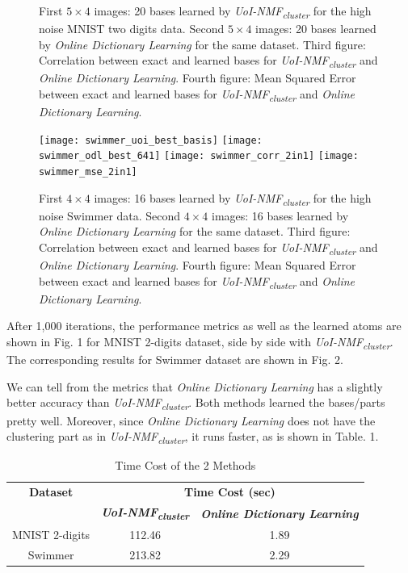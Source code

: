 \documentclass[conference]{IEEEtran}
\begin{document}
\begin{figure}[!htb]
\endminipage
\caption{First $5\times 4$ images: 20 bases learned by \textit{UoI-NMF\textsubscript{cluster}} for the high noise MNIST two digits data. Second $5\times 4$ images: 20 bases learned by \textit{Online Dictionary Learning} for the same dataset. Third figure: Correlation between exact and learned bases for \textit{UoI-NMF\textsubscript{cluster}} and \textit{Online Dictionary Learning}. Fourth figure: Mean Squared Error between exact and learned bases for \textit{UoI-NMF\textsubscript{cluster}} and \textit{Online Dictionary Learning}. }\label{fig:mnist_4}
\end{figure}

\begin{figure}[!htb]
\centering
{}
  \texttt{[image: swimmer\_uoi\_best\_basis]}
\endminipage\hfill
{}
  \texttt{[image: swimmer\_odl\_best\_641]}
\endminipage\hfill
{}%
  \texttt{[image: swimmer\_corr\_2in1]}
\endminipage
{}%
  \texttt{[image: swimmer\_mse\_2in1]}
\endminipage
\caption{First $4\times 4$ images: 16 bases learned by \textit{UoI-NMF\textsubscript{cluster}} for the
high noise Swimmer data. Second $4\times 4$ images: 16 bases learned by \textit{Online Dictionary Learning} for the same dataset. Third figure: Correlation between exact and learned bases for \textit{UoI-NMF\textsubscript{cluster}} and \textit{Online Dictionary Learning}. Fourth figure: Mean Squared Error between exact and learned bases for \textit{UoI-NMF\textsubscript{cluster}} and \textit{Online Dictionary Learning}. }\label{fig:swimmer_4}
\end{figure}

After 1,000 iterations, the performance metrics as well as the learned atoms are shown in Fig. 1 for MNIST 2-digits dataset, side by side with \textit{UoI-NMF\textsubscript{cluster}}. The corresponding results for Swimmer dataset are shown in Fig. 2.

We can tell from the metrics that \textit{Online Dictionary Learning} has a slightly better accuracy than \textit{UoI-NMF\textsubscript{cluster}}. Both methods learned the bases/parts pretty well. Moreover, since \textit{Online Dictionary Learning} does not have the clustering part as in \textit{UoI-NMF\textsubscript{cluster}}, it runs faster, as is shown in Table. 1.

\begin{table}[htbp]
\caption{Time Cost of the 2 Methods}
\begin{center}
\begin{tabular}{|c|c|c|}
\hline
\textbf{Dataset}&\multicolumn{2}{|c|}{\textbf{Time Cost (sec)}} \\
\cline{2-3}
 & \textbf{\textit{UoI-NMF\textsubscript{cluster}}}& \textbf{\textit{Online Dictionary Learning}} \\
\hline
MNIST 2-digits & 112.46 & 1.89 \\
\hline
Swimmer & 213.82 & 2.29 \\
\hline
\end{tabular}
\label{tab1}
\end{center}
\end{table}
\end{document}
